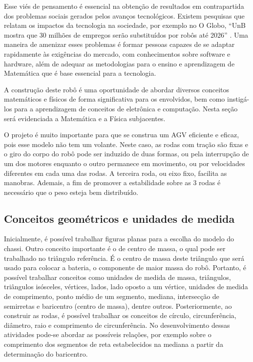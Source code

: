 \documentclass{textolivre}
\begin{document}
Esse viés de pensamento é essencial na obtenção de resultados em contrapartida
dos problemas sociais gerados pelos avanços tecnológicos. Existem pesquisas que
relatam os impactos da tecnologia na sociedade, por exemplo no O Globo, “UnB
mostra que 30 milhões de empregos serão substituídos por robôs até 2026”
\cite{carvalho2019}. Uma maneira de amenizar esses problemas é formar pessoas
capazes de se adaptar rapidamente às exigências do mercado, com conhecimentos
sobre software e hardware, além de adequar as metodologias para o ensino e
aprendizagem de Matemática que é base essencial para a tecnologia.

A construção deste robô é uma oportunidade de abordar diversos conceitos
matemáticos e físicos de forma significativa para os envolvidos, bem como
instigá-los para a aprendizagem de conceitos de eletrônica e computação. Nesta
seção será evidenciada a Matemática e a Física subjacentes.

O projeto é muito importante para que se construa um AGV eficiente e eficaz,
pois esse modelo não tem um volante. Neste caso, as rodas com tração são fixas
e o giro do corpo do robô pode ser induzido de duas formas, ou pela interrupção
de um dos motores enquanto o outro permanece em movimento, ou por velocidades
diferentes em cada uma das rodas. A terceira roda, ou eixo fixo, facilita as
manobras. Ademais, a fim de promover a estabilidade sobre as 3 rodas é
necessário que o peso esteja bem distribuído.


\subsection{Conceitos geométricos e unidades de medida}\label{sec-conceitos}
Inicialmente, é possível trabalhar figuras planas para a escolha do modelo do
chassi. Outro conceito importante é o de centro de massa, o qual pode ser
trabalhado no triângulo referência. É o centro de massa deste triângulo que
será usado para colocar a bateria, o componente de maior massa do robô.
Portanto, é possível trabalhar conceitos como unidades de medida de massa,
triângulos, triângulos isósceles, vértices, lados, lado oposto a um vértice,
unidades de medida de comprimento, ponto médio de um segmento, mediana,
intersecção de semirretas e baricentro (centro de massa), dentre outros.
Posteriormente, ao construir as rodas, é possível trabalhar os conceitos de
círculo, circunferência, diâmetro, raio e comprimento de circunferência. No
desenvolvimento dessas atividades pode-se abordar as possíveis relações, por
exemplo sobre o comprimento dos segmentos de reta estabelecidos na mediana a
partir da determinação do baricentro.
\end{document}
